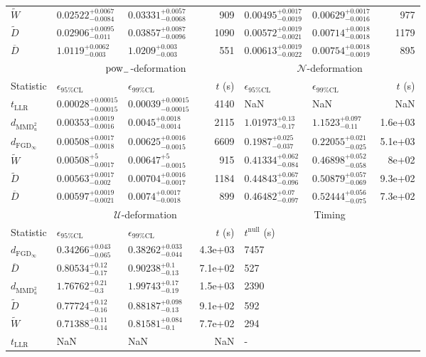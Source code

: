 \begin{tabular}{l|llr|llr}
	$\widetilde{W}$ & $0.02522_{-0.0084}^{+0.0067}$ & $0.03331_{-0.0068}^{+0.0057}$ & 909 & $0.00495_{-0.0019}^{+0.0017}$ & $0.00629_{-0.0016}^{+0.0017}$ & 977 \\
	$\widetilde{D}$ & $0.02906_{-0.011}^{+0.0095}$ & $0.03857_{-0.0096}^{+0.0087}$ & 1090 & $0.00572_{-0.0021}^{+0.0019}$ & $0.00714_{-0.0018}^{+0.0018}$ & 1179 \\
	$\overline{D}$ & $1.0119_{-0.003}^{+0.0062}$ & $1.0209_{-0.003}^{+0.003}$ & 551 & $0.00613_{-0.0022}^{+0.0019}$ & $0.00754_{-0.0019}^{+0.0018}$ & 895 \\
	\toprule
	\multicolumn{1}{c}{} & \multicolumn{3}{c}{$\rm{pow}_{-}$-deformation} & \multicolumn{3}{c}{$\mathcal{N}$-deformation} \\
	Statistic & $\epsilon_{95\%\mathrm{CL}}$ & $\epsilon_{99\%\mathrm{CL}}$ & $t$ (s) & $\epsilon_{95\%\mathrm{CL}}$ & $\epsilon_{99\%\mathrm{CL}}$ & $t$ (s) \\
	\midrule
	$t_{\mathrm{LLR}}$ & $0.00028_{-0.00015}^{+0.00015}$ & $0.00039_{-0.00015}^{+0.00015}$ & 4140 & NaN & NaN & NaN \\
	$d_{\mathrm{MMD}^{2}_{u}}$ & $0.00353_{-0.0016}^{+0.0019}$ & $0.0045_{-0.0014}^{+0.0018}$ & 2115 & $1.01973_{-0.17}^{+0.13}$ & $1.1523_{-0.11}^{+0.097}$ & 1.6e+03 \\
	$d_{\mathrm{FGD}_{\infty}}$ & $0.00508_{-0.0018}^{+0.0017}$ & $0.00625_{-0.0015}^{+0.0016}$ & 6609 & $0.1987_{-0.037}^{+0.025}$ & $0.22055_{-0.025}^{+0.021}$ & 5.1e+03 \\
	$\widetilde{W}$ & $0.00508_{-0.0017}^{+5}$ & $0.00647_{-0.0015}^{+5}$ & 915 & $0.41334_{-0.084}^{+0.062}$ & $0.46898_{-0.058}^{+0.052}$ & 8e+02 \\
	$\widetilde{D}$ & $0.00563_{-0.002}^{+0.0017}$ & $0.00704_{-0.0017}^{+0.0016}$ & 1184 & $0.44843_{-0.096}^{+0.067}$ & $0.50879_{-0.069}^{+0.057}$ & 9.3e+02 \\
	$\overline{D}$ & $0.00597_{-0.0021}^{+0.0019}$ & $0.0074_{-0.0018}^{+0.0017}$ & 899 & $0.46482_{-0.097}^{+0.07}$ & $0.52444_{-0.075}^{+0.056}$ & 7.3e+02 \\
	\toprule
	\multicolumn{1}{c}{} & \multicolumn{3}{c}{$\mathcal{U}$-deformation} & \multicolumn{3}{c}{Timing} \\
	Statistic & $\epsilon_{95\%\mathrm{CL}}$ & $\epsilon_{99\%\mathrm{CL}}$ & $t$ (s) & $t^{\mathrm{null}}$ (s) \\
	\midrule
	$d_{\mathrm{FGD}_{\infty}}$ & $0.34266_{-0.065}^{+0.043}$ & $0.38262_{-0.044}^{+0.033}$ & 4.3e+03 & 7457 \\
	$\overline{D}$ & $0.80534_{-0.17}^{+0.12}$ & $0.90238_{-0.13}^{+0.1}$ & 7.1e+02 & 527 \\
	$d_{\mathrm{MMD}^{2}_{u}}$ & $1.76762_{-0.3}^{+0.21}$ & $1.99743_{-0.19}^{+0.17}$ & 1.5e+03 & 2390 \\
	$\widetilde{D}$ & $0.77724_{-0.16}^{+0.12}$ & $0.88187_{-0.13}^{+0.098}$ & 9.1e+02 & 592 \\
	$\widetilde{W}$ & $0.71388_{-0.14}^{+0.11}$ & $0.81581_{-0.1}^{+0.084}$ & 7.7e+02 & 294 \\
	$t_{\mathrm{LLR}}$ & NaN & NaN & NaN & - \\
	\bottomrule
\end{tabular}